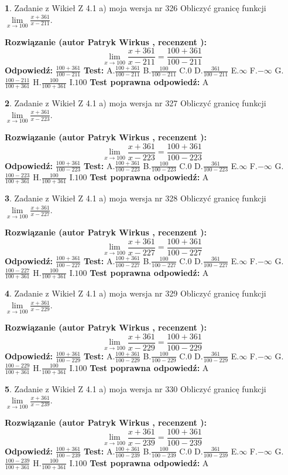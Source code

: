 \documentclass[12pt, a4paper]{article}
\theoremstyle{definition} %
\newtheorem{zad}{}
\newcommand{\zadStart}[1]{\begin{zad}#1\newline}
\newcommand{\zadStop}{\end{zad}}
\newcommand{\rozwStart}[2]{\noindent \textbf{Rozwiązanie (autor #1 , recenzent #2): }\newline}
\newcommand{\rozwStop}{\newline}
\newcommand{\odpStart}{\noindent \textbf{Odpowiedź:}\newline}
\newcommand{\odpStop}{\newline}
\newcommand{\testStart}{\noindent \textbf{Test:}\newline}
\newcommand{\testStop}{\newline}
\newcommand{\kluczStart}{\noindent \textbf{Test poprawna odpowiedź:}\newline}
\newcommand{\kluczStop}{\newline}
\begin{document}
\zadStart{Zadanie z Wikieł Z 4.1 a) moja wersja nr 326}
Obliczyć granicę funkcji $\lim\limits_{x\to100}\frac{x+361}{x-211}$.
\zadStop
\rozwStart{Patryk Wirkus}{}
$$\lim\limits_{x\to100}\frac{x+361}{x-211} = \frac{100+361}{100-211}$$
\rozwStop
\odpStart
$\frac{100+361}{100-211}$
\odpStop
\testStart
A.$\frac{100+361}{100-211}$
B.$\frac{100}{100-211}$
C.$0$
D.$\frac{361}{100-211}$
E.$\infty$
F.$-\infty$
G.$\frac{100-211}{100+361}$
H.$\frac{100}{100+361}$
I.$100$
\testStop
\kluczStart
A
\kluczStop



\zadStart{Zadanie z Wikieł Z 4.1 a) moja wersja nr 327}
Obliczyć granicę funkcji $\lim\limits_{x\to100}\frac{x+361}{x-223}$.
\zadStop
\rozwStart{Patryk Wirkus}{}
$$\lim\limits_{x\to100}\frac{x+361}{x-223} = \frac{100+361}{100-223}$$
\rozwStop
\odpStart
$\frac{100+361}{100-223}$
\odpStop
\testStart
A.$\frac{100+361}{100-223}$
B.$\frac{100}{100-223}$
C.$0$
D.$\frac{361}{100-223}$
E.$\infty$
F.$-\infty$
G.$\frac{100-223}{100+361}$
H.$\frac{100}{100+361}$
I.$100$
\testStop
\kluczStart
A
\kluczStop



\zadStart{Zadanie z Wikieł Z 4.1 a) moja wersja nr 328}
Obliczyć granicę funkcji $\lim\limits_{x\to100}\frac{x+361}{x-227}$.
\zadStop
\rozwStart{Patryk Wirkus}{}
$$\lim\limits_{x\to100}\frac{x+361}{x-227} = \frac{100+361}{100-227}$$
\rozwStop
\odpStart
$\frac{100+361}{100-227}$
\odpStop
\testStart
A.$\frac{100+361}{100-227}$
B.$\frac{100}{100-227}$
C.$0$
D.$\frac{361}{100-227}$
E.$\infty$
F.$-\infty$
G.$\frac{100-227}{100+361}$
H.$\frac{100}{100+361}$
I.$100$
\testStop
\kluczStart
A
\kluczStop



\zadStart{Zadanie z Wikieł Z 4.1 a) moja wersja nr 329}
Obliczyć granicę funkcji $\lim\limits_{x\to100}\frac{x+361}{x-229}$.
\zadStop
\rozwStart{Patryk Wirkus}{}
$$\lim\limits_{x\to100}\frac{x+361}{x-229} = \frac{100+361}{100-229}$$
\rozwStop
\odpStart
$\frac{100+361}{100-229}$
\odpStop
\testStart
A.$\frac{100+361}{100-229}$
B.$\frac{100}{100-229}$
C.$0$
D.$\frac{361}{100-229}$
E.$\infty$
F.$-\infty$
G.$\frac{100-229}{100+361}$
H.$\frac{100}{100+361}$
I.$100$
\testStop
\kluczStart
A
\kluczStop



\zadStart{Zadanie z Wikieł Z 4.1 a) moja wersja nr 330}
Obliczyć granicę funkcji $\lim\limits_{x\to100}\frac{x+361}{x-239}$.
\zadStop
\rozwStart{Patryk Wirkus}{}
$$\lim\limits_{x\to100}\frac{x+361}{x-239} = \frac{100+361}{100-239}$$
\rozwStop
\odpStart
$\frac{100+361}{100-239}$
\odpStop
\testStart
A.$\frac{100+361}{100-239}$
B.$\frac{100}{100-239}$
C.$0$
D.$\frac{361}{100-239}$
E.$\infty$
F.$-\infty$
G.$\frac{100-239}{100+361}$
H.$\frac{100}{100+361}$
I.$100$
\testStop
\kluczStart
A
\kluczStop
\end{document}
